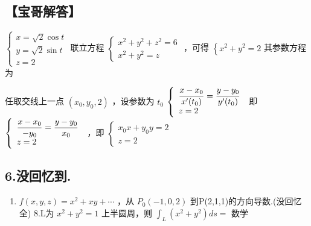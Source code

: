 \documentclass[11pt,fontset=fandol]{ctexart}
\providecommand{\tightlist}{\setlength{\itemsep}{0pt}\setlength{\parskip}{0pt}}
\begin{document}
\subsection{【宝哥解答】}\label{ux5b9dux54e5ux89e3ux7b54-2}

\(\left\{ { \begin{array} { l } { x = { \sqrt { 2 } } \cos t } \\ { y = { \sqrt { 2 } } \sin t } \\ { z = 2 } \end{array} } \right.\)
联立方程
\(\left\{ { \begin{array} { l } { x ^ { 2 } + y ^ { 2 } + z ^ { 2 } = 6 } \\ { x ^ { 2 } + y ^ { 2 } = z } \end{array} } \right.\)
，可得 \(\left\{ x ^ { 2 } + y ^ { 2 } = 2 \right.\) 其参数方程为

任取交线上一点 \(( x _ { 0 } , y _ { 0 } , 2 )\) ，设参数为
\(t _ { 0 }\)
\(\left\{ \begin{array} { l l } { \displaystyle \frac { x - x _ { 0 } } { x ^ { \prime } ( t _ { 0 } ) } = \frac { y - y _ { 0 } } { y ^ { \prime } ( t _ { 0 } ) } } \\ { z = 2 } \end{array} \right.\)
即
\(\left\{ \begin{array} { l l } { \displaystyle { \frac { x - x _ { 0 } } { - y _ { 0 } } } = { \frac { y - y _ { 0 } } { x _ { 0 } } } } \\ { z = 2 } \end{array} \right.\)
，即
\(\left\{ { \begin{array} { l } { x _ { \mathrm { 0 } } x + y _ { \mathrm { 0 } } y = 2 } \\ { z = 2 } \end{array} } \right.\)

\subsection{6.没回忆到.}\label{ux6ca1ux56deux5fc6ux5230.}

\begin{enumerate}
\def\labelenumi{\arabic{enumi}.}
\setcounter{enumi}{6}
\tightlist
\item
  \(f ( x , y , z ) = x ^ { 2 } + x y + \cdots\) ，从
  \(P _ { 0 } ( - 1 , 0 , 2 )\) 到P(2,1,1)的方向导数.(没回忆全) 8.L为
  \(x ^ { 2 } + y ^ { 2 } = 1\) 上半圆周，则
  \(\int _ { L } { ( x ^ { 2 } + y ^ { 2 } ) d s } =\) 数学
\end{enumerate}
\end{document}
